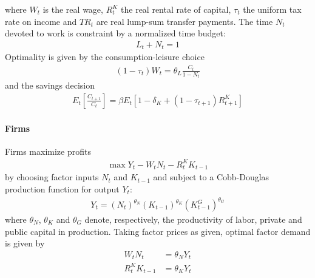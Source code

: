   where \(W_t\) is the real wage, \(R^K_t\) the real rental rate of capital,
  \(\tau_t\) the uniform tax rate on income and \({TR}_t\) are real lump-sum transfer payments.
The time \(N_t\) devoted to work is constraint by a normalized time budget:
\begin{align*}
L_t + N_t = 1
\end{align*}
Optimality is given by the consumption-leisure choice
\begin{align}
(1-\tau_t) W_t = \theta_L \frac{C_t}{1-N_t} \label{eq:BaxterKing:ConsumptionLeisure}
\end{align}
and the savings decision
\begin{align}
E_t \left[ \frac{C_{t+1}}{C_t}\right] = \beta E_t \left[ 1-\delta_K + (1-\tau_{t+1})R^K_{t+1}\right] \label{eq:BaxterKing:SavingsDecision}
\end{align}

\paragraph*{Firms}
Firms maximize profits
\begin{align*}
\max Y_t - W_t N_t - R^K_{t} K_{t-1}
\end{align*}
by choosing factor inputs \(N_t\) and \(K_{t-1}\) and subject to a Cobb-Douglas production function for output \(Y_t\):
\begin{align}
Y_t = {(N_t)}^{\theta_N} {(K_{t-1})}^{\theta_K} {(K_{t-1}^G)}^{\theta_G} \label{eq:BaxterKing:CobbDouglasProductionFunction}
\end{align}
  where \(\theta_N\), \(\theta_K\) and \(\theta_G\) denote, respectively,
  the productivity of labor, private and public capital in production.
Taking factor prices as given, optimal factor demand is given by
\begin{align}
W_t N_t &= \theta_N Y_t \label{eq:BaxterKing:LaborDemand}\\
R^K_{t} K_{t-1} &= \theta_K Y_t \label{eq:BaxterKing:PrivateCapitalDemand}
\end{align}

